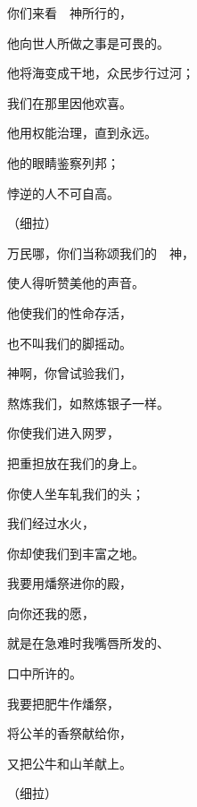 {\par }
{\BB \par }{\Q {}你们来看　神所行的，
\par }{\Q 他向世人所做之事是可畏的。
\par }{\Q {}他将海变成干地，众民步行过河；
\par }{\Q 我们在那里因他欢喜。
\par }{\Q {}他用权能治理{}，直到永远。
\par }{\Q 他的眼睛鉴察列邦；
\par }{\Q 悖逆的人不可自高。
\par }{\QS （细拉）
\par }
{\BB \par }{\Q {}万民哪，你们当称颂我们的　神，
\par }{\Q 使人得听赞美他的声音。
\par }{\Q {}他使我们的性命存活，
\par }{\Q 也不叫我们的脚摇动。
\par }{\Q {}神啊，你曾试验我们，
\par }{\Q 熬炼我们，如熬炼银子一样。
\par }{\Q {}你使我们进入网罗，
\par }{\Q 把重担放在我们的身上。
\par }{\Q {}你使人坐车轧我们的头；
\par }{\Q 我们经过水火，
\par }{\Q 你却使我们到丰富之地。
\par }{\BB \par }{\Q {}我要用燔祭进你的殿，
\par }{\Q 向你还我的愿，
\par }{\Q {}就是在急难时我嘴唇所发的、
\par }{\Q 口中所许的。
\par }{\Q {}我要把肥牛作燔祭，
\par }{\Q 将公羊的香祭献给你，
\par }{\Q 又把公牛和山羊献上。
\par }{\QS （细拉）
\par }
